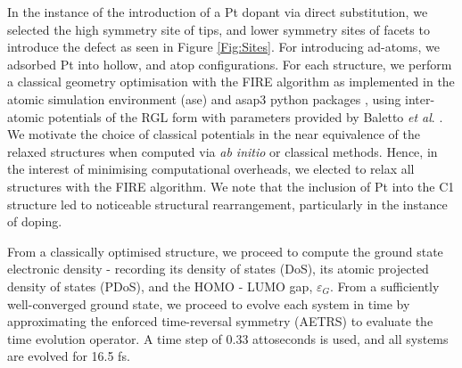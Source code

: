 In the instance of the introduction of a Pt dopant via direct substitution, we selected the high symmetry site of tips, and lower symmetry sites of facets to introduce the defect as seen in Figure \ref{Fig:Sites}. For introducing ad-atoms, we adsorbed Pt into hollow, and atop configurations. For each structure, we perform a classical geometry optimisation with the FIRE \cite{Fire} algorithm as implemented in the atomic simulation environment (ase) and asap3 python packages \cite{ase-paper,asap3}, using inter-atomic potentials of the RGL form \cite{RGL} with parameters provided by Baletto \textit{et al}. \cite{RGL_Pot}. We motivate the choice of classical potentials in the near equivalence of the relaxed structures when computed via \textit{ab initio} or classical methods. Hence, in the interest of minimising computational overheads, we elected to relax all structures with the FIRE algorithm. We note that the inclusion of Pt into the C1 structure led to noticeable structural rearrangement, particularly in the instance of doping.

From a classically optimised structure, we proceed to compute the ground state electronic density - recording its density of states (DoS), its atomic projected density of states (PDoS), and the HOMO - LUMO gap, $\varepsilon_{G}$. From a sufficiently well-converged ground state, we proceed to evolve each system in time by approximating the enforced time-reversal symmetry (AETRS) \cite{aetrs} to evaluate the time evolution operator. A time step of 0.33 attoseconds is used, and all systems are evolved for 16.5 fs.

